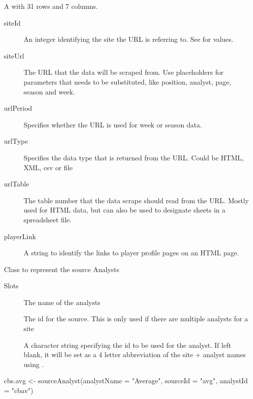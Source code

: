\documentclass[a4paper]{book}
\begin{document}
\begin{Format}
A  with 31 rows and 7 columns.
\begin{description}

\item[siteId] An integer identifying the site the URL is referring to. See
 for values.
\item[siteUrl] The URL that the data will be scraped from. Use placeholders
for parameters that needs to be substituted, like position, analyst, page,
season and week.
\item[urlPeriod] Specifies whether the URL is used for week or season data.
\item[urlType] Specifies the data type that is returned from the URL. Could be
HTML, XML, csv or file
\item[urlTable] The table number that the data scrape should read from the
URL. Mostly used for HTML data, but can also be used to designate sheets in
a spreadsheet file.
\item[playerLink] A string to identify the links to player profile pages on
an HTML page.

\end{description}
\end{Format}
%
\begin{Description}\relax
Class to represent the source Analysts
\end{Description}
%
\begin{Section}{Slots}

\begin{description}

\item[] The name of the analysts

\item[] The id for the source. This is only used if there are multiple
analysts for a site

\item[] A character string specifying the id to be used for the analyst.
If left blank, it will be set as a 4 letter abbreviation of the site + analyst
names using .

\end{description}
\end{Section}
%
\begin{Examples}
\begin{ExampleCode}
cbs.avg <- sourceAnalyst(analystName = "Average",
                         sourceId = "avg",
                         analystId = "cbav")
\end{ExampleCode}
\end{Examples}
\end{document}

